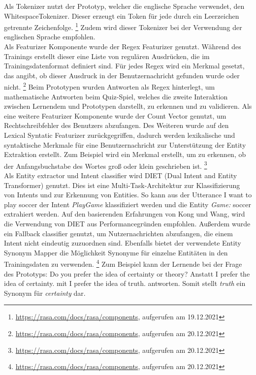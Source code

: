 Als Tokenizer nutzt der Prototyp, welcher die englische Sprache verwendet, den WhitespaceTokenizer. Dieser erzeugt ein Token für jede durch ein Leerzeichen getrennte Zeichenfolge. \footnote{\url{https://rasa.com/docs/rasa/components}, aufgerufen am 19.12.2021}
Zudem wird dieser Tokenizer bei der Verwendung der englischen Sprache empfohlen. \parencite[40]{Kong.2021}\\
Als Featurizer Komponente wurde der Regex Featurizer genutzt. Während des Trainings erstellt dieser eine Liste von regulären Ausdrücken,
die im Trainingsdatenformat definiert sind. Für jedes Regex wird ein Merkmal gesetzt, das angibt, ob dieser Ausdruck in der Benutzernachricht
gefunden wurde oder nicht. \footnote{\url{https://rasa.com/docs/rasa/components}, aufgerufen am 20.12.2021}
Beim Prototypen wurden Antworten als Regex hinterlegt, um mathematische Antworten beim Quiz-Spiel, welches die zweite Interaktion
zwischen Lernendem und Prototypen darstellt, zu erkennen und zu validieren.
Als eine weitere Featurizer Komponente wurde der Count Vector genutzt, um Rechtschreibfehler des Benutzers abzufangen.
Des Weiteren wurde auf den Lexical Syntatic Featurizer zurückgegriffen, dadurch werden lexikalische und syntaktische Merkmale
für eine Benutzernachricht zur Unterstützung der Entity Extraktion erstellt. Zum Beispiel wird ein Merkmal erstellt, um zu erkennen, ob der Anfangsbuchstabe des Wortes 
groß oder klein geschrieben ist. \footnote{\url{https://rasa.com/docs/rasa/components}, aufgerufen am 20.12.2021}\\
Als Entity extractor und Intent classifier wird DIET (Dual Intent and Entity Transformer) genutzt. Dies ist eine Multi-Task-Architektur zur Klassifizierung von Intents
und zur Erkennung von Entities. So kann aus der Utterance \glqq I want to play soccer\grqq{} der Intent \textit{PlayGame} klassifiziert werden und
die Entity \textit{Game:} \glqq soccer\grqq{} extrahiert werden. Auf den basierenden Erfahrungen von Kong und Wang, wird die Verwendung von 
DIET aus Performancegründen empfohlen. \parencite[47]{Kong.2021}
Außerdem wurde ein Fallback classifier genutzt, um Nutzernachrichten abzufangen, die einem Intent nicht eindeutig zuzuordnen sind. 
Ebenfalls bietet der verwendete Entity Synonym Mapper die Möglichkeit Synonyme für einzelne Entitäten in den Trainingsdaten zu verwenden. \footnote{\url{https://rasa.com/docs/rasa/components}, aufgerufen am 20.12.2021}
Zum Beispiel kann der Lernende bei der Frage des Prototyps: \glqq Do you prefer the idea of certainty or theory?\grqq{}  
Anstatt \glqq I prefer the idea of certainty.\grqq{} mit \glqq I prefer the idea of truth.\grqq{} antworten. Somit stellt \textit{truth} ein Synonym für \textit{certainty} dar.


